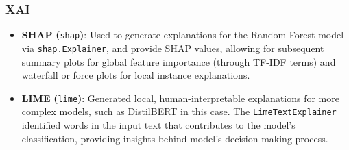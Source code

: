 
\subsubsection*{XAI}

\begin{itemize}
  \item \textbf{SHAP} \textbf{(}\texttt{shap}\textbf{)}: Used to generate explanations for the Random Forest model via \texttt{shap.Explainer}, and provide SHAP values, allowing for subsequent summary plots for global feature importance (through TF-IDF terms) and waterfall or force plots for local instance explanations.
  \item \textbf{LIME} \textbf{(}\texttt{lime}\textbf{)}: Generated local, human-interpretable explanations for more complex models, such as DistilBERT in this case. The \texttt{LimeTextExplainer} identified words in the input text that contributes to the model's classification, providing insights behind model's decision-making process.
\end{itemize}
